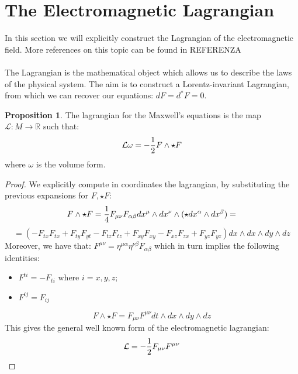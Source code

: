 \documentclass[12pt,a4paper]{report}
\theoremstyle{definition}
\theoremstyle{Theorem}
\newtheorem{Prop}[Def]{Proposition}
\theoremstyle{definition}
\theoremstyle{definition}
\begin{document}
	\section{The Electromagnetic Lagrangian}
	In this section we will explicitly construct the Lagrangian of the electromagnetic field. More references on this topic can be found in REFERENZA
	\\\\
	The Lagrangian is the mathematical object which allows us to describe the laws of the physical system. The aim is to construct a Lorentz-invariant Lagrangian, from which we can recover our equations: $dF=d^*F=0$.
	\begin{Prop}\label{Prop_8.1.2}
		The lagrangian for the Maxwell's equations is the map $\mathcal{L}:M\rightarrow \mathbb{R}$ such that:
		$$\mathcal{L}\omega=-{1\over 2}F\wedge \star F$$
		where $\omega$ is the volume form.
	\end{Prop}
	\begin{proof}
		We explicitly compute in coordinates the lagrangian, by substituting the previous expansions for $F,\star F$:
		$$F\wedge \star F={1\over 4}F_{\mu\nu}F_{\alpha\beta}dx^\mu\wedge dx^\nu \wedge (\star dx^\alpha\wedge dx^\beta)=$$
		$$=(-F_{tx}F_{tx}+F_{ty}F_{yt}-F_{tz}F_{tz}+F_{xy}F_{xy}-F_{xz}F_{zx}+F_{yz}F_{yz})dx\wedge dx\wedge dy\wedge dz$$
		Moreover, we have that: $F^{\mu\nu}=\eta^{\mu\alpha}\eta^{\nu\beta}F_{\alpha\beta}$ which in turn implies the following identities:
			\begin{itemize}
				\item $F^{ti}=-F_{ti}$ where $i=x,y,z$;
				\item $F^{ij}=F_{ij}$
			\end{itemize}
		$$F\wedge \star F=F_{\mu\nu}F^{\mu\nu}dt\wedge dx\wedge dy\wedge dz$$
		This gives the general well known form of the electromagnetic lagrangian:
		$$\mathcal{L}=-{1\over 2}F_{\mu\nu}F^{\mu\nu}$$
	\end{proof}
\end{document}
